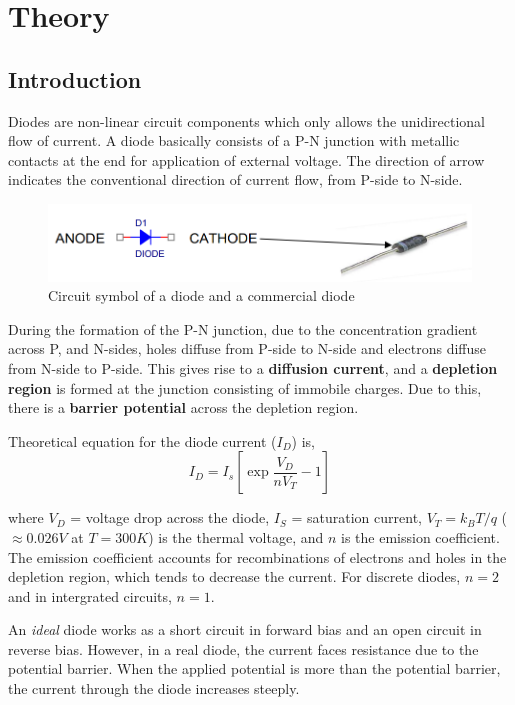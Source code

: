 \section{Theory}
\subsection{Introduction}
Diodes are non-linear circuit components which only allows the unidirectional flow of current. A diode basically consists of a P-N junction with metallic contacts at the end for application of external voltage. The direction of arrow indicates the conventional direction of current flow, from P-side to N-side.

\begin{figure}[H]
    \centering
    \includegraphics[width=0.8\columnwidth]{images/d1.png}
    \caption{Circuit symbol of a diode and a commercial diode}
\end{figure}

During the formation of the P-N junction, due to the concentration gradient across P, and N-sides, holes diffuse from P-side to N-side and electrons diffuse from N-side to P-side. This gives rise to a \textbf{diffusion current}, and a \textbf{depletion region} is formed at the junction consisting of immobile charges. Due to this, there is a \textbf{barrier potential} across the depletion region.

Theoretical equation for the diode current ($I_D$) is,
\begin{equation}
    I_D = I_s\left[\exp{\frac{V_D}{nV_T}} - 1\right]
\end{equation}

where $V_D$ = voltage drop across the diode, $I_S$ = saturation current, $V_T = k_BT/q$ ($\approx 0.026V$ at $T=300K$) is the thermal voltage, and $n$ is the emission coefficient. The emission coefficient accounts for recombinations of electrons and holes in the depletion region, which tends to decrease the current. For discrete diodes, $n = 2$ and in intergrated circuits, $n=1$.


An \textit{ideal} diode works as a short circuit in forward bias and an open circuit in reverse bias. However, in a real diode, the current faces resistance due to the potential barrier. When the applied potential is more than the potential barrier, the current through the diode increases steeply.

